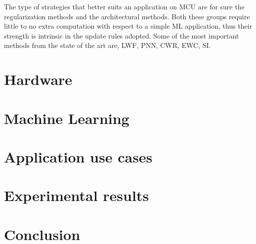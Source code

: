 \documentclass[12pt]{report}
\begin{document}
The type of strategies that better suits an application on MCU are for sure the regularization methods and the architectural methods. Both these groups require little to no extra computation with respect to a simple ML application, thus their strength is intrinsic in the update rules adopted. Some of the most important methods from the state of the art are, LWF, PNN, CWR, EWC, SI. 









\chapter{Hardware} 








\chapter{Machine Learning}





\chapter{Application use cases}







\chapter{Experimental results} 






\chapter{Conclusion}













\end{document}
